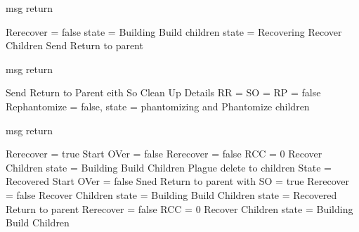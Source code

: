 \documentclass{article}
\begin{document}
	
\begin{algorithm}
\caption{msg return}
\label{ Done message received}
\begin{algorithmic}[1]
		\State Rerecover = false
			\State state = Building			
			\State Build children
		\Else
			\State state = Recovering
			\State Recover Children
		\EndIf
	\Else
		\State Send Return to parent	
	\EndIf
\EndIf
{}
\end{algorithmic}
\end{algorithm}

\begin{algorithm}
\caption{msg return}
\label{ Done message received}
\begin{algorithmic}[1]
			\State Send Return to Parent eith So
		\EndIf
		\State Clean Up Details
		\State RR = SO = RP = false
	\Else
		\State Rephantomize = false, state = phantomizing and Phantomize children
	\EndIf
\EndIf
{}
\end{algorithmic}
\end{algorithm}

\begin{algorithm}
\caption{msg return}
\label{ build or recoveryDone message received}
\begin{algorithmic}[1]
				\State Rerecover = true
				\State Start OVer = false
				\State Rerecover = false
				\State RCC = 0
					\State Recover Children
					\State state = Building
					\State Build Children
				\EndIf
				\State Plague delete to children
			\EndIf
		\Else
				\State State = Recovered
				\State Start OVer = false
				\State Sned Return to parent with SO = true
				\State Rerecover = false
					\State Recover Children
					\State state = Building
					\State Build Children
				\EndIf
				\State state = Recovered
				\State Return to parent
			\EndIf
		\EndIf
			\State Rerecover = false
				\State RCC = 0
			\EndIf
				\State Recover Children
				\State state = Building
				\State Build Children
			\EndIf
		\EndIf
	\EndIf
\EndIf
\EndProcedure
\end{algorithmic}
\end{algorithm}	
\end{document}
